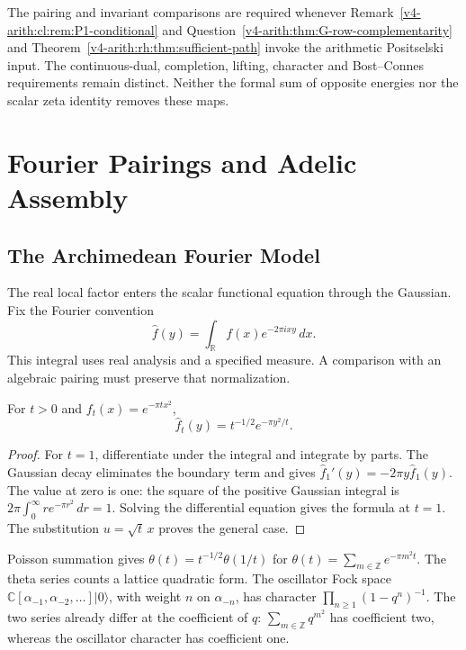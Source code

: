 \begin{remark}
\label{v4-arith:pos:rem:form-prop}
The pairing and invariant comparisons are required whenever
Remark~\ref{v4-arith:cl:rem:P1-conditional} and Question~\ref{v4-arith:thm:G-row-complementarity} and Theorem~\ref{v4-arith:rh:thm:sufficient-path} invoke the arithmetic Positselski
input. The continuous-dual, completion, lifting, character and
Bost--Connes requirements remain distinct. Neither the formal sum of
opposite energies nor the scalar zeta identity removes these maps.
\end{remark}

\section{Fourier Pairings and Adelic Assembly}
\label{v4-arith:pos:archimedean}

\subsection{The Archimedean Fourier Model}
\label{v4-arith:pos:archimedean-analogue}

The real local factor enters the scalar functional equation
through the Gaussian. Fix the Fourier convention
\[
 \widehat f(y)=\int_{\mathbb R}f(x)e^{-2\pi ixy}\,dx.
\]
This integral uses real analysis and a specified measure.
A comparison with an algebraic pairing must preserve that
normalization.

\begin{theorem}
\label{v4-arith:pos:thm:gaussian-positselski}
For \(t>0\) and \(f_t(x)=e^{-\pi t x^2}\),
\[
 \widehat f_t(y)=t^{-1/2}e^{-\pi y^2/t}.
\]
\end{theorem}
\begin{proof}
For \(t=1\), differentiate under the integral and integrate
by parts. The Gaussian decay eliminates the boundary term
and gives \(\widehat f_1'(y)=-2\pi y\widehat f_1(y)\).
The value at zero is one: the square of the positive Gaussian
integral is \(2\pi\int_0^\infty r e^{-\pi r^2}\,dr=1\).
Solving the differential equation gives the formula at \(t=1\).
The substitution \(u=\sqrt t\,x\) proves the general case.
\end{proof}

Poisson summation gives
\(\theta(t)=t^{-1/2}\theta(1/t)\) for
\(\theta(t)=\sum_{m\in\mathbb Z}e^{-\pi m^2t}\).
The theta series counts a lattice quadratic form.
The oscillator Fock space
\(\mathbb C[\alpha_{-1},\alpha_{-2},\ldots]|0\rangle\),
with weight \(n\) on \(\alpha_{-n}\), has character
\(\prod_{n\ge1}(1-q^n)^{-1}\).
The two series already differ at the coefficient of \(q\):
\(\sum_{m\in\mathbb Z}q^{m^2}\) has coefficient two,
whereas the oscillator character has coefficient one.

